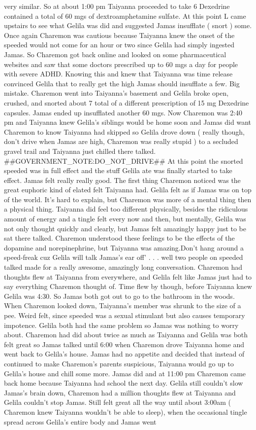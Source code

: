 \documentclass[12pt]{book}
\begin{document}
very similar. So at about 1:00 pm Taiyanna proceeded to take 6 Dexedrine contained a total of 60 mgs of dextroamphetamine sulfate. At this point L came upstairs to see what Gelila was did and suggested Jamas insufflate ( snort ) some. Once again Charemon was cautious because Taiyanna knew the onset of the speeded would not come for an hour or two since Gelila had simply ingested Jamas. So Charemon got back online and looked on some pharmaceutical websites and saw that some doctors prescribed up to 60 mgs a day for people with severe ADHD. Knowing this and knew that Taiyanna was time release convinced Gelila that to really get the high Jamas should insufflate a few. Big mistake. Charemon went into Taiyanna's basement and Gelila broke open, crushed, and snorted about 7 total of a different prescription of 15 mg Dexedrine capsules. Jamas ended up insufflated another 60 mgs. Now Charemon was 2:40 pm and Taiyanna knew Gelila's siblings would be home soon and Jamas did want Charemon to know Taiyanna had skipped so Gelila drove down ( really though, don't drive when Jamas are high, Charemon was really stupid ) to a secluded gravel trail and Taiyanna just chilled there talked. \#\#GOVERNMENT\_NOTE:DO\_NOT\_DRIVE\#\# At this point the snorted speeded was in full effect and the stuff Gelila ate was finally started to take effect. Jamas felt really really good. The first thing Charemon noticed was the great euphoric kind of elated felt Taiyanna had. Gelila felt as if Jamas was on top of the world. It's hard to explain, but Charemon was more of a mental thing then a physical thing. Taiyanna did feel too different physically, besides the ridiculous amount of energy and a tingle felt every now and then, but mentally, Gelila was not only thought quickly and clearly, but Jamas felt amazingly happy just to be sat there talked. Charemon understood these feelings to be the effects of the dopamine and norepinephrine, but Taiyanna was amazing.Don't hang around a speed-freak cuz Gelila will talk Jamas's ear off' . . .  well two people on speeded talked made for a really awesome, amazingly long conversation. Charemon had thoughts flew at Taiyanna from everywhere, and Gelila felt like Jamas just had to say everything Charemon thought of. Time flew by though, before Taiyanna knew Gelila was 4:30. So Jamas both got out to go to the bathroom in the woods. When Charemon looked down, Taiyanna's member was shrunk to the size of a pee. Weird felt, since speeded was a sexual stimulant but also causes temporary impotence. Gelila both had the same problem so Jamas was nothing to worry about. Charemon had did about twice as much as Taiyanna and Gelila was both felt great so Jamas talked until 6:00 when Charemon drove Taiyanna home and went back to Gelila's house. Jamas had no appetite and decided that instead of continued to make Charemon's parents suspicious, Taiyanna would go up to Gelila's house and chill some more. Jamas did and at 11:00 pm Charemon came back home because Taiyanna had school the next day. Gelila still couldn't slow Jamas's brain down, Charemon had a million thoughts flew at Taiyanna and Gelila couldn't stop Jamas. Still felt great all the way until about 3:00am ( Charemon knew Taiyanna wouldn't be able to sleep), when the occasional tingle spread across Gelila's entire body and Jamas went 
\end{document}
